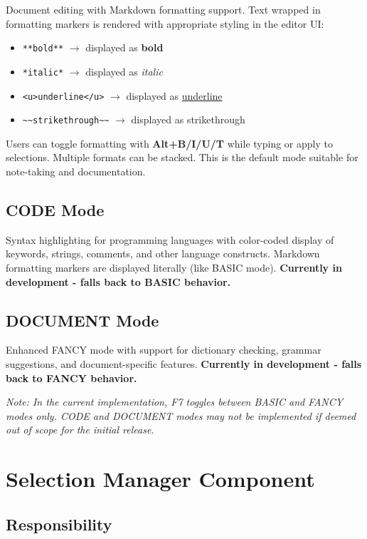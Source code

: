 \documentclass[12pt,a4paper,oneside,openany]{report}
\begin{document}
Document editing with Markdown formatting support. Text wrapped in formatting markers is rendered with appropriate styling in the editor UI:
\begin{itemize}
	\item \texttt{**bold**} $\rightarrow$ displayed as \textbf{bold}
	\item \texttt{*italic*} $\rightarrow$ displayed as \textit{italic}
	\item \texttt{<u>underline</u>} $\rightarrow$ displayed as \underline{underline}
	\item \texttt{\textasciitilde\textasciitilde strikethrough\textasciitilde\textasciitilde} $\rightarrow$ displayed as strikethrough
\end{itemize}
Users can toggle formatting with \textbf{Alt+B/I/U/T} while typing or apply to selections. Multiple formats can be stacked. This is the default mode suitable for note-taking and documentation.

\subsection{CODE Mode}

Syntax highlighting for programming languages with color-coded display of keywords, strings, comments, and other language constructs. Markdown formatting markers are displayed literally (like BASIC mode). \textbf{Currently in development - falls back to BASIC behavior.}

\subsection{DOCUMENT Mode}

Enhanced FANCY mode with support for dictionary checking, grammar suggestions, and document-specific features. \textbf{Currently in development - falls back to FANCY behavior.}

\medskip
\textit{Note: In the current implementation, F7 toggles between BASIC and FANCY modes only. CODE and DOCUMENT modes may not be implemented if deemed out of scope for the initial release.}

\section{Selection Manager Component}

\subsection{Responsibility}
\end{document}
